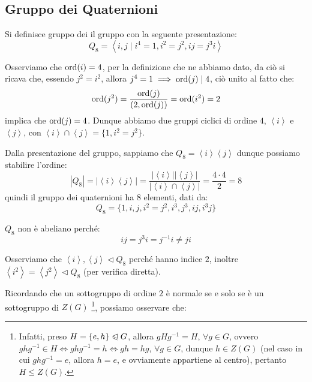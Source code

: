 \documentclass[11pt]{scrartcl}
\begin{document}
\newpage
\subsection{Gruppo dei Quaternioni}

\begin{definition}
    Si definisce gruppo dei  il gruppo con la seguente presentazione:
        \[ Q_8 = \left<i,j \mid i^4 = 1, i^2 = j^2, ij = j^3i\right>
            \]
\end{definition}

\begin{remark}[Ordini di $i$ e $j$]
    Osserviamo che $\operatorname{ord}(i) = 4$, per la definizione che ne abbiamo dato, da ciò si ricava che, essendo $j^2 = i^2$,
    allora $j^4 = 1 \implies \operatorname{ord}(j) \mid 4$, ciò unito al fatto che:
        \[ \operatorname{ord}(j^2) = \frac{\operatorname{ord}(j)}{(2,\operatorname{ord}(j))} = \operatorname{ord}(i^2) = 2
            \]
    implica che $\operatorname{ord}(j) = 4$. Dunque abbiamo due gruppi ciclici di ordine $4$, $\left<i\right>$ e $\left<j\right>$, con
    $\left<i\right> \cap \left<j\right> = \{1,i^2 = j^2\}$.
\end{remark}

Dalla presentazione del gruppo, sappiamo che $Q_8 = \left<i\right>\left<j\right>$ dunque possiamo stabilire l'ordine:
    \[ |Q_8| = |\left<i\right>\left<j\right>| = \frac{|\left<i\right>||\left<j\right>|}{|\left<i\right> \cap \left<j\right>|} = \frac{4 \cdot 4 }{2} = 8
        \]
quindi il gruppo dei quaternioni ha $8$ elementi, dati da:
    \[ Q_8 = \{1, i, j, i^2 = j^2, i^3, j^3, ij, i^3j\}
        \]

\begin{remark}
    $Q_8$ non è abeliano perché:
        \[ ij = j^3i = j^{-1}i \ne ji
            \]
\end{remark}

\begin{remark}
    Osserviamo che $\left<i\right>,\left<j\right> \triangleleft Q_8$ perché hanno indice $2$, inoltre $\left<i^2\right> = \left<j^2\right> \triangleleft Q_8$ (per verifica diretta). 
\end{remark}

Ricordando che un sottogruppo di ordine $2$ è normale se e solo se è un sottogruppo di $Z(G)$ \footnote{Infatti, preso $H = \{e,h\} \trianglelefteqslant G$, allora $gHg^{-1} = H$, $\forall g \in G$, ovvero $ghg^{-1} \in H \iff ghg^{-1} = h \iff
gh = hg$, $\forall g \in G$, dunque $h \in Z(G)$ (nel caso in cui $ghg^{-1} = e$, allora $h = e$, e ovviamente appartiene al centro), pertanto $H \leqslant Z(G)$.}, possiamo osservare che:
\end{document}
